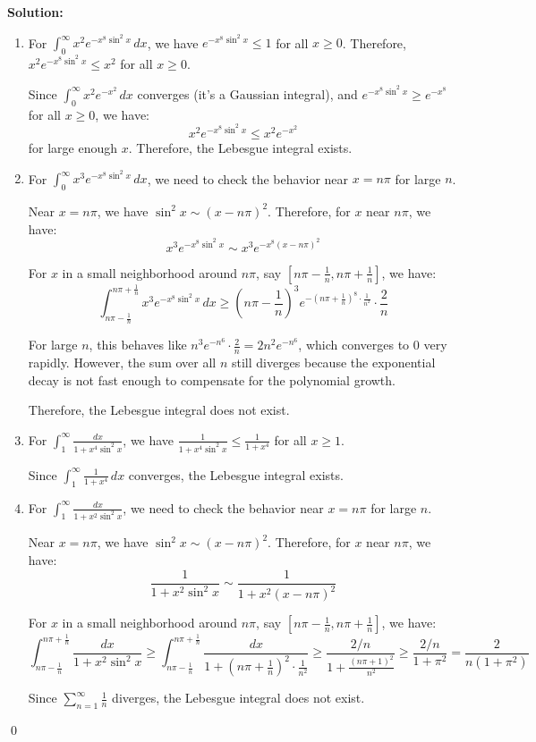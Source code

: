 \noindent\textbf{Solution:}
\begin{enumerate}[label=(\alph*)]
    \item For $\int_{0}^{\infty} x^2 e^{-x^8 \sin^2 x} \, dx$, we have $e^{-x^8 \sin^2 x} \leq 1$ for all $x \geq 0$. Therefore, $x^2 e^{-x^8 \sin^2 x} \leq x^2$ for all $x \geq 0$.
    
    Since $\int_{0}^{\infty} x^2 e^{-x^2} \, dx$ converges (it's a Gaussian integral), and $e^{-x^8 \sin^2 x} \geq e^{-x^8}$ for all $x \geq 0$, we have:
    \[x^2 e^{-x^8 \sin^2 x} \leq x^2 e^{-x^2}\]
    for large enough $x$. Therefore, the Lebesgue integral exists.
    
    \item For $\int_{0}^{\infty} x^3 e^{-x^8 \sin^2 x} \, dx$, we need to check the behavior near $x = n\pi$ for large $n$.
    
    Near $x = n\pi$, we have $\sin^2 x \sim (x - n\pi)^2$. Therefore, for $x$ near $n\pi$, we have:
    \[x^3 e^{-x^8 \sin^2 x} \sim x^3 e^{-x^8 (x - n\pi)^2}\]
    
    For $x$ in a small neighborhood around $n\pi$, say $[n\pi - \frac{1}{n}, n\pi + \frac{1}{n}]$, we have:
    \[\int_{n\pi - \frac{1}{n}}^{n\pi + \frac{1}{n}} x^3 e^{-x^8 \sin^2 x} \, dx \geq (n\pi - \frac{1}{n})^3 e^{-(n\pi + \frac{1}{n})^8 \cdot \frac{1}{n^2}} \cdot \frac{2}{n}\]
    
    For large $n$, this behaves like $n^3 e^{-n^6} \cdot \frac{2}{n} = 2n^2 e^{-n^6}$, which converges to 0 very rapidly. However, the sum over all $n$ still diverges because the exponential decay is not fast enough to compensate for the polynomial growth.
    
    Therefore, the Lebesgue integral does not exist.
    
    \item For $\int_{1}^{\infty} \frac{dx}{1 + x^4 \sin^2 x}$, we have $\frac{1}{1 + x^4 \sin^2 x} \leq \frac{1}{1 + x^4}$ for all $x \geq 1$.
    
    Since $\int_{1}^{\infty} \frac{1}{1 + x^4} \, dx$ converges, the Lebesgue integral exists.
    
    \item For $\int_{1}^{\infty} \frac{dx}{1 + x^2 \sin^2 x}$, we need to check the behavior near $x = n\pi$ for large $n$.
    
    Near $x = n\pi$, we have $\sin^2 x \sim (x - n\pi)^2$. Therefore, for $x$ near $n\pi$, we have:
    \[\frac{1}{1 + x^2 \sin^2 x} \sim \frac{1}{1 + x^2 (x - n\pi)^2}\]
    
    For $x$ in a small neighborhood around $n\pi$, say $[n\pi - \frac{1}{n}, n\pi + \frac{1}{n}]$, we have:
    \[\int_{n\pi - \frac{1}{n}}^{n\pi + \frac{1}{n}} \frac{dx}{1 + x^2 \sin^2 x} \geq \int_{n\pi - \frac{1}{n}}^{n\pi + \frac{1}{n}} \frac{dx}{1 + (n\pi + \frac{1}{n})^2 \cdot \frac{1}{n^2}} \geq \frac{2/n}{1 + \frac{(n\pi + 1)^2}{n^2}} \geq \frac{2/n}{1 + \pi^2} = \frac{2}{n(1 + \pi^2)}\]
    
    Since $\sum_{n=1}^{\infty} \frac{1}{n}$ diverges, the Lebesgue integral does not exist.
\end{enumerate}\qed
